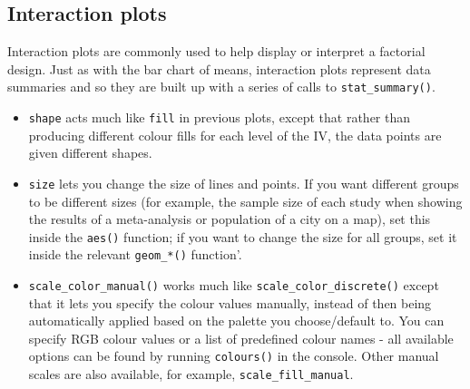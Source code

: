 \documentclass[
  english,
  doc,floatsintext]{apa6}
\begin{document}
\hypertarget{interaction-plots}{%
\subsection{Interaction plots}\label{interaction-plots}}

Interaction plots are commonly used to help display or interpret a factorial design. Just as with the bar chart of means, interaction plots represent data summaries and so they are built up with a series of calls to \texttt{stat\_summary()}.

\begin{itemize}
\item
  \texttt{shape} acts much like \texttt{fill} in previous plots, except that rather than producing different colour fills for each level of the IV, the data points are given different shapes.
\item
  \texttt{size} lets you change the size of lines and points. If you want different groups to be different sizes (for example, the sample size of each study when showing the results of a meta-analysis or population of a city on a map), set this inside the \texttt{aes()} function; if you want to change the size for all groups, set it inside the relevant \texttt{geom\_*()} function'.
\item
  \texttt{scale\_color\_manual()} works much like \texttt{scale\_color\_discrete()} except that it lets you specify the colour values manually, instead of then being automatically applied based on the palette you choose/default to. You can specify RGB colour values or a list of predefined colour names - all available options can be found by running \texttt{colours()} in the console. Other manual scales are also available, for example, \texttt{scale\_fill\_manual}.
\end{itemize}
\end{document}
